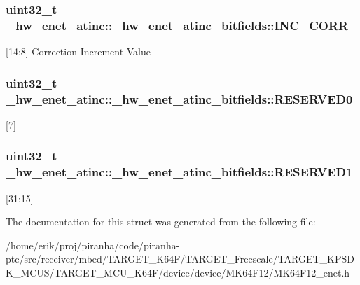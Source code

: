 \subsubsection[{\texorpdfstring{I\+N\+C\+\_\+\+C\+O\+RR}{INC_CORR}}]{\setlength{\rightskip}{0pt plus 5cm}uint32\+\_\+t \+\_\+hw\+\_\+enet\+\_\+atinc\+::\+\_\+hw\+\_\+enet\+\_\+atinc\+\_\+bitfields\+::\+I\+N\+C\+\_\+\+C\+O\+RR}\hypertarget{struct__hw__enet__atinc_1_1__hw__enet__atinc__bitfields_ac4e8177f7db402bcd480085fd34e0df9}{}\label{struct__hw__enet__atinc_1_1__hw__enet__atinc__bitfields_ac4e8177f7db402bcd480085fd34e0df9}
\mbox{[}14\+:8\mbox{]} Correction Increment Value 
\subsubsection[{\texorpdfstring{R\+E\+S\+E\+R\+V\+E\+D0}{RESERVED0}}]{\setlength{\rightskip}{0pt plus 5cm}uint32\+\_\+t \+\_\+hw\+\_\+enet\+\_\+atinc\+::\+\_\+hw\+\_\+enet\+\_\+atinc\+\_\+bitfields\+::\+R\+E\+S\+E\+R\+V\+E\+D0}\hypertarget{struct__hw__enet__atinc_1_1__hw__enet__atinc__bitfields_a546dc949037ade4fc27cc9a125bfa058}{}\label{struct__hw__enet__atinc_1_1__hw__enet__atinc__bitfields_a546dc949037ade4fc27cc9a125bfa058}
\mbox{[}7\mbox{]} 
\subsubsection[{\texorpdfstring{R\+E\+S\+E\+R\+V\+E\+D1}{RESERVED1}}]{\setlength{\rightskip}{0pt plus 5cm}uint32\+\_\+t \+\_\+hw\+\_\+enet\+\_\+atinc\+::\+\_\+hw\+\_\+enet\+\_\+atinc\+\_\+bitfields\+::\+R\+E\+S\+E\+R\+V\+E\+D1}\hypertarget{struct__hw__enet__atinc_1_1__hw__enet__atinc__bitfields_ad1466a83dfc9532a2d18ae3734b3bf86}{}\label{struct__hw__enet__atinc_1_1__hw__enet__atinc__bitfields_ad1466a83dfc9532a2d18ae3734b3bf86}
\mbox{[}31\+:15\mbox{]} 

The documentation for this struct was generated from the following file\+:\begin{DoxyCompactItemize}
\item 
/home/erik/proj/piranha/code/piranha-\/ptc/src/receiver/mbed/\+T\+A\+R\+G\+E\+T\+\_\+\+K64\+F/\+T\+A\+R\+G\+E\+T\+\_\+\+Freescale/\+T\+A\+R\+G\+E\+T\+\_\+\+K\+P\+S\+D\+K\+\_\+\+M\+C\+U\+S/\+T\+A\+R\+G\+E\+T\+\_\+\+M\+C\+U\+\_\+\+K64\+F/device/device/\+M\+K64\+F12/M\+K64\+F12\+\_\+enet.\+h\end{DoxyCompactItemize}
